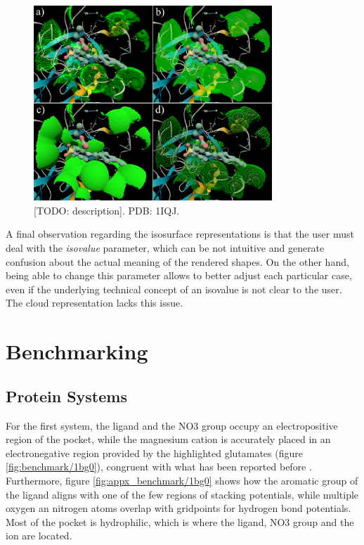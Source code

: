     \begin{figure}[H]
      \centering
      \includegraphics[width=0.8\textwidth]{figures/results/reprs_2.png}
      \caption{\label{fig:results/reprs_2} [TODO: description]. PDB: 1IQJ.}
    \end{figure}

    A final observation regarding the isosurface representations is that the user must deal with the \textit{isovalue} parameter, which can be not intuitive and generate confusion about the actual meaning of the rendered shapes. On the other hand, being able to change this parameter allows to better adjust each particular case, even if the underlying technical concept of an isovalue is not clear to the user. The cloud representation lacks this issue.


\section{Benchmarking}
  \subsection{Protein Systems}
    For the first system, the ligand and the NO3 group occupy an electropositive region of the pocket, while the magnesium cation is accurately placed in an electronegative region provided by the highlighted glutamates (figure \ref{fig:benchmark/1bg0}), congruent with what has been reported before \cite{benchmark_negative_2000}. Furthermore, figure \ref{fig:appx_benchmark/1bg0} shows how the aromatic group of the ligand aligns with one of the few regions of stacking potentials, while multiple oxygen an nitrogen atoms overlap with gridpoints for hydrogen bond potentials. Most of the pocket is hydrophilic, which is where the ligand, NO3 group and the ion are located.

